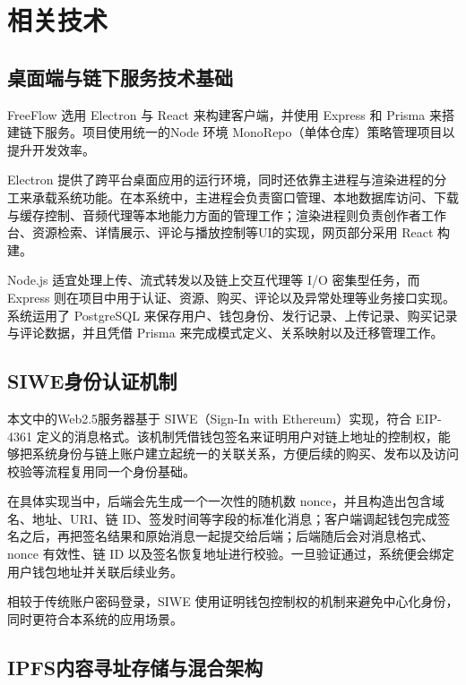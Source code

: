 
\chapter{相关技术}

\section{桌面端与链下服务技术基础}

FreeFlow 选用 Electron 与 React 来构建客户端，并使用 Express 和 Prisma 来搭建链下服务。项目使用统一的Node 环境 MonoRepo（单体仓库）策略管理项目以提升开发效率。

Electron 提供了跨平台桌面应用的运行环境，同时还依靠主进程与渲染进程的分工来承载系统功能\cite{electronDocs,electronIPC}。在本系统中，主进程会负责窗口管理、本地数据库访问、下载与缓存控制、音频代理等本地能力方面的管理工作；渲染进程则负责创作者工作台、资源检索、详情展示、评论与播放控制等UI的实现，网页部分采用 React\cite{reactDocs} 构建。

Node.js 适宜处理上传、流式转发以及链上交互代理等 I/O 密集型任务，而 Express 则在项目中用于认证、资源、购买、评论以及异常处理等业务接口\cite{nodeDocs,expressDocs}实现。系统运用了 PostgreSQL 来保存用户、钱包身份、发行记录、上传记录、购买记录与评论数据，并且凭借 Prisma 来完成模式定义、关系映射以及迁移管理工作\cite{prismaDocs}。

\section{SIWE身份认证机制}

本文中的Web2.5服务器基于 SIWE（Sign-In with Ethereum）实现，符合 EIP-4361 定义的消息格式\cite{eip4361}。该机制凭借钱包签名来证明用户对链上地址的控制权，能够把系统身份与链上账户建立起统一的关联关系，方便后续的购买、发布以及访问校验等流程复用同一个身份基础。

在具体实现当中，后端会先生成一个一次性的随机数 nonce，并且构造出包含域名、地址、URI、链 ID、签发时间等字段的标准化消息；客户端调起钱包完成签名之后，再把签名结果和原始消息一起提交给后端；后端随后会对消息格式、nonce 有效性、链 ID 以及签名恢复地址进行校验\cite{eip4361}。一旦验证通过，系统便会绑定用户钱包地址并关联后续业务。

相较于传统账户密码登录，SIWE 使用证明钱包控制权的机制来避免中心化身份，同时更符合本系统的应用场景。

\section{IPFS内容寻址存储与混合架构}

